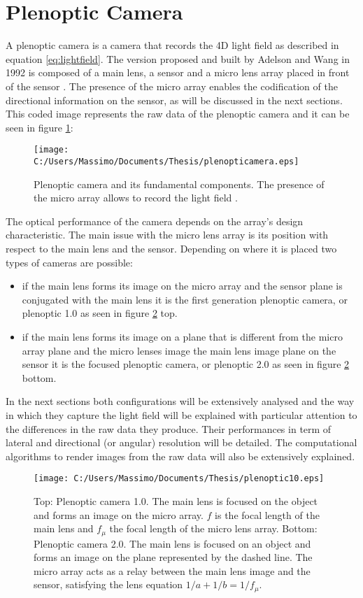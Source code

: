 \section{Plenoptic Camera}
\label{sec:plenoticcamera}
A plenoptic camera is a camera that records the 4D light field as described in equation \ref{eq:lightfield}. The version proposed and built by Adelson and Wang in 1992 \cite{adelson1992single} is composed of a main lens, a sensor and a micro lens array placed in front of the sensor \cite{adelson1992single}. The presence of the micro array enables the codification of the directional information on the sensor, as will be discussed in the next sections. This coded image represents the raw data of the plenoptic camera and it can be seen in figure \ref{fig:plenoptic1}: 
\begin{figure}[H]
	\centering
	\texttt{[image: C:/Users/Massimo/Documents/Thesis/plenopticamera.eps]}
	\caption{\label{fig:plenoptic1} Plenoptic camera and its fundamental components. The presence of the micro array allows to record the light field .}
\end{figure}
The optical performance of the camera depends on the array's design characteristic. The main issue with the micro lens array is its position with respect to the main lens and the sensor. Depending on where it is placed two types of cameras are possible:
\begin{itemize}
	\item if the main lens forms its image on the micro array and the sensor plane is conjugated with the main lens it is the first generation plenoptic camera, or plenoptic 1.0 \cite{ng2005light} as seen in figure \ref{fig:plenoptic2} top.
	\item if the main lens forms its image on a plane that is different from the micro array plane and the micro lenses image the main lens image plane on the sensor it is the focused plenoptic camera, or plenoptic 2.0 \cite{georgiev2010focused} as seen in figure \ref{fig:plenoptic2} bottom.
\end{itemize}
 In the next sections both configurations will be extensively analysed and the way in which they capture the light field will be explained with particular attention to the differences in the raw data they produce. Their performances in term of lateral and directional (or angular) resolution will be detailed. The computational algorithms to render images from the raw data will also be extensively explained.
\begin{figure}[H]
	\centering
	\texttt{[image: C:/Users/Massimo/Documents/Thesis/plenoptic10.eps]}
	\caption{\label{fig:plenoptic2}Top: Plenoptic camera 1.0. The main lens is focused on the object and forms an image on the micro array. $f$ is the focal length of the main lens and $f_\mu$ the focal length of the micro lens array. Bottom: Plenoptic camera 2.0. The main lens is focused on an object and forms an image on the plane represented by the dashed line. The micro array acts as a relay between the main lens image and the sensor, satisfying the lens equation $1/a+1/b=1/f_\mu$.}
\end{figure}

